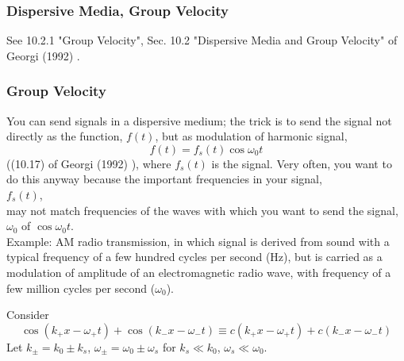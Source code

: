 \subsubsection{Dispersive Media, Group Velocity}

See 10.2.1 "Group Velocity", Sec. 10.2 "Dispersive Media and Group Velocity" of Georgi (1992) \cite{dgdt:Geor1992}.

\subsubsection{Group Velocity}

You can send signals in a dispersive medium; the trick is to send the signal not directly as the function, $f(t)$, but as modulation of harmonic signal,
\begin{equation}
	f(t) = f_s(t) \cos{\omega_0 t}
\end{equation}
((10.17) of Georgi (1992) \cite{dgdt:Geor1992}), where $f_s(t)$ is the signal. Very often, you want to do this anyway because the important frequencies in your signal, \\
$f_s(t)$, \\
may not match frequencies of the waves with which you want to send the signal, $\omega_0$ of $\cos{\omega_0 t}$. \\

Example: AM radio transmission, in which signal is derived from sound with a typical frequency of a few hundred cycles per second (Hz), but is carried as a modulation of amplitude of an electromagnetic radio wave, with frequency of a few million cycles per second ($\omega_0$).

Consider 
\[
\cos{ (k_+ x - \omega_+ t)} + \cos{ (k_- x - \omega_- t)} \equiv c(k_+ x - \omega_+ t) + c(k_- x - \omega_- t)
\]
Let $k_{\pm} = k_0 \pm k_s$, $\omega_{\pm} = \omega_0 \pm \omega_s$ for $k_s \ll k_0$, $\omega_s \ll \omega_0$.

